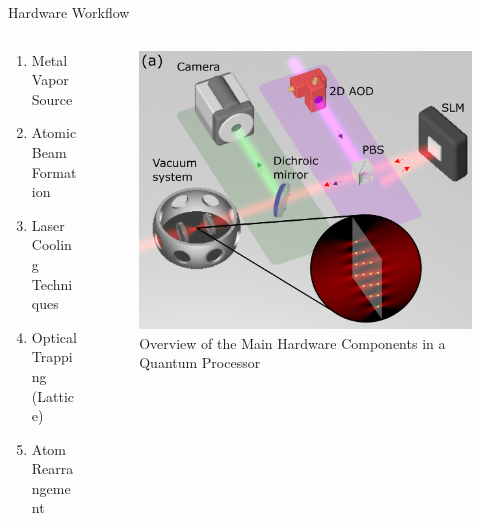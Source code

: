 \begin{frame}{Hardware Workflow}
    \begin{columns}
        \begin{column}{.3\textwidth}
            \begin{enumerate}
                \item Metal Vapor Source
                \item Atomic Beam Formation
                \item Laser Cooling Techniques
                \item Optical Trapping (Lattice)
                \item Atom Rearrangement
            \end{enumerate}
        \end{column}
        \begin{column}{.7\textwidth}
            \begin{figure}
                \includegraphics[width=.9\textwidth]{images/image.png}
                \caption{Overview of the Main Hardware Components in a Quantum Processor}
            \end{figure}
        \end{column}
    \end{columns}
\end{frame}

